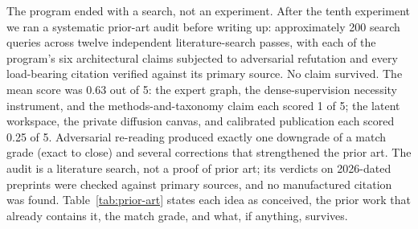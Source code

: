 \documentclass[10pt,a4paper]{article}
\begin{document}
The program ended with a search, not an experiment. After the tenth experiment we ran a systematic prior-art audit before writing up: approximately 200 search queries across twelve independent literature-search passes, with each of the program's six architectural claims subjected to adversarial refutation and every load-bearing citation verified against its primary source. No claim survived. The mean score was 0.63 out of 5: the expert graph, the dense-supervision necessity instrument, and the methods-and-taxonomy claim each scored 1 of 5; the latent workspace, the private diffusion canvas, and calibrated publication each scored 0.25 of 5. Adversarial re-reading produced exactly one downgrade of a match grade (exact to close) and several corrections that strengthened the prior art. The audit is a literature search, not a proof of prior art; its verdicts on 2026-dated preprints were checked against primary sources, and no manufactured citation was found. Table~\ref{tab:prior-art} states each idea as conceived, the prior work that already contains it, the match grade, and what, if anything, survives.
\end{document}
